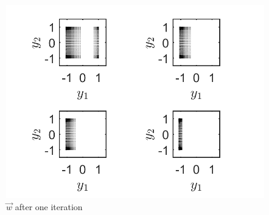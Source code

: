 \documentclass[11pt, a4paper]{article}
\theoremstyle{definition}
\begin{document}
	\begin{figure}[h]
	\centering
	\includegraphics[scale=0.6]{InOutFlow.png}
	\caption{$\vec w$ after one iteration} 
	\label{F03}
    \end{figure}
	
\end{document}
